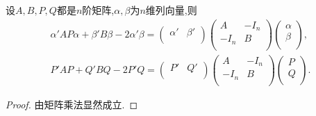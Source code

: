 \documentclass[../../main.tex]{subfiles}
\begin{document}
\begin{lemma}\label{lemma:矩阵二次型技巧}
设$A,B,P,Q$都是$n$阶矩阵,$\alpha,\beta$为$n$维列向量,则
\begin{align*}
\alpha ' AP\alpha +\beta ' B\beta -2\alpha ' \beta =\left( \begin{matrix}
\alpha '&		\beta '\\
\end{matrix} \right) \left( \begin{matrix}
A&		-I_n\\
-I_n&		B\\
\end{matrix} \right) \left( \begin{array}{c}
\alpha\\
\beta\\
\end{array} \right) ,
\\
P' AP+Q' BQ-2P' Q=\left( \begin{matrix}
P'&		Q'\\
\end{matrix} \right) \left( \begin{matrix}
A&		-I_n\\
-I_n&		B\\
\end{matrix} \right) \left( \begin{array}{c}
P\\
Q\\
\end{array} \right) .
\end{align*}
\end{lemma}
\begin{proof}
由矩阵乘法显然成立.
\end{proof}
\end{document}
